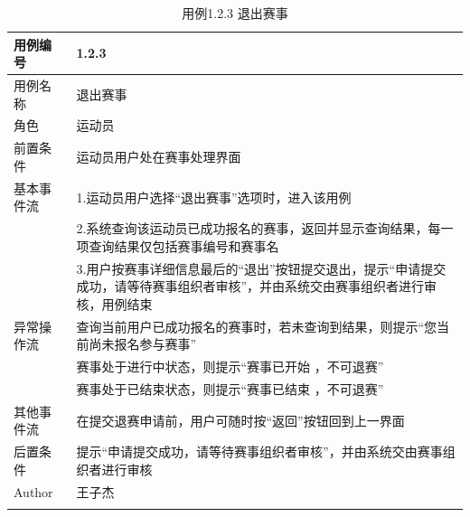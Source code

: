 \documentclass[a4paper,UTF8]{article}
\begin{document}
\begin{table}[H]
	\begin{center}
		\caption{用例1.2.3 退出赛事}
		\label{table:Tab_uc123}
		\begin{tabular}{|p{}|p{}|}
			\hline\noalign{\smallskip}
			用例编号 & 1.2.3\\
			\hline
			用例名称 &  退出赛事\\
			\hline
			角色 & 运动员\\
			\hline
			前置条件 & 运动员用户处在赛事处理界面\\
			\hline
			基本事件流 & 1.运动员用户选择“退出赛事”选项时，进入该用例 \\& 2.系统查询该运动员已成功报名的赛事，返回并显示查询结果，每一项查询结果仅包括赛事编号和赛事名 \\& 3.用户按赛事详细信息最后的“退出”按钮提交退出，提示“申请提交成功，请等待赛事组织者审核”，并由系统交由赛事组织者进行审核，用例结束\\
			\hline
			异常操作流 & 查询当前用户已成功报名的赛事时，若未查询到结果，则提示“您当前尚未报名参与赛事” \\& 赛事处于进行中状态，则提示“赛事已开始 ，不可退赛” \\& 赛事处于已结束状态，则提示“赛事已结束 ，不可退赛” \\
			\hline
			其他事件流 & 在提交退赛申请前，用户可随时按“返回”按钮回到上一界面\\
			\hline
			后置条件 & 提示“申请提交成功，请等待赛事组织者审核”，并由系统交由赛事组织者进行审核\\
			\hline
			Author & 王子杰 \\
			\noalign{\smallskip}
			\hline
			\noalign{\smallskip}
		\end{tabular}
	\end{center}
\end{table}
\end{document}

